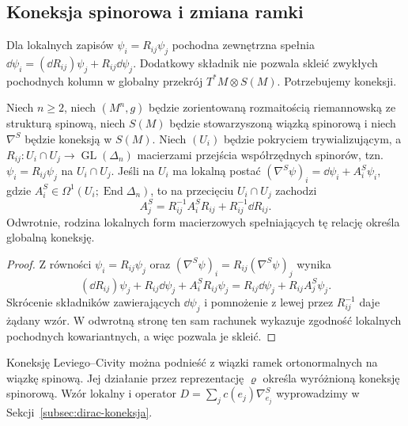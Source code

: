 \subsection{Koneksja spinorowa i zmiana ramki}

Dla lokalnych zapisów $\psi_i=R_{ij}\psi_j$ pochodna
zewnętrzna spełnia
$\dd\psi_i=(\dd R_{ij})\psi_j+R_{ij}\dd\psi_j$.
Dodatkowy składnik nie pozwala skleić zwykłych
pochodnych kolumn w globalny przekrój
$T^*M\otimes S(M)$. Potrzebujemy koneksji.

\begin{stwierdzenie}
\label{prop:pola-spinorowe-transformacja-koneksji}
Niech $n\geq2$, niech $(M^n,g)$ będzie zorientowaną
rozmaitością riemannowską ze strukturą spinową,
niech $S(M)$ będzie stowarzyszoną wiązką spinorową
i niech $\nabla^S$ będzie koneksją w $S(M)$.
Niech $(U_i)$ będzie pokryciem trywializującym,
a $R_{ij}:U_i\cap U_j\to\operatorname{GL}(\Delta_n)$
macierzami przejścia współrzędnych spinorów, tzn.
$\psi_i=R_{ij}\psi_j$ na $U_i\cap U_j$.
Jeśli na $U_i$ ma lokalną postać
$(\nabla^S\psi)_i=\dd\psi_i+A_i^S\psi_i$,
gdzie $A_i^S\in\Omega^1(U_i;\operatorname{End}\Delta_n)$,
to na przecięciu $U_i\cap U_j$ zachodzi
\begin{equation}\label{eq:pola-spinorowe-transformacja-koneksji}
 A_j^S=R_{ij}^{-1}A_i^SR_{ij}+R_{ij}^{-1}\dd R_{ij}.
\end{equation}
Odwrotnie, rodzina lokalnych form macierzowych
spełniających tę relację określa globalną koneksję.
\end{stwierdzenie}
\begin{proof}
Z równości $\psi_i=R_{ij}\psi_j$ oraz
$(\nabla^S\psi)_i=R_{ij}(\nabla^S\psi)_j$
wynika
\[
 (\dd R_{ij})\psi_j+R_{ij}\dd\psi_j
   +A_i^SR_{ij}\psi_j
 =R_{ij}\dd\psi_j+R_{ij}A_j^S\psi_j.
\]
Skrócenie składników zawierających $\dd\psi_j$
i pomnożenie z lewej przez $R_{ij}^{-1}$ daje
żądany wzór. W odwrotną stronę ten sam rachunek
wykazuje zgodność lokalnych pochodnych kowariantnych,
a więc pozwala je skleić.
\end{proof}

\begin{uwaga}
Koneksję Leviego--Civity można podnieść z wiązki
ramek ortonormalnych na wiązkę spinową. Jej działanie
przez reprezentację $\varrho$ określa wyróżnioną
koneksję spinorową. Wzór lokalny i operator
$D=\sum_jc(e_j)\nabla^S_{e_j}$ wyprowadzimy
w Sekcji~\ref{subsec:dirac-koneksja}.
\end{uwaga}

